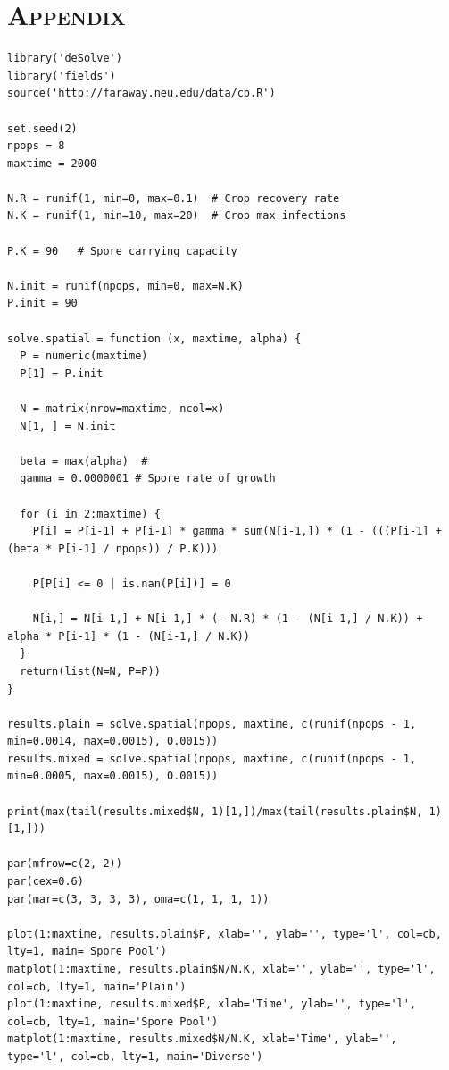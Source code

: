 \documentclass[a4paper,12pt]{article}
\newenvironment{code}{\fontfamily{cmtt}\selectfont}{\par}
\begin{document}

\newpage

\section*{\upshape\textsc{Appendix}}

\singlespacing

\begin{code}
\begin{lstlisting}[frame=single]
library('deSolve')
library('fields')
source('http://faraway.neu.edu/data/cb.R')

set.seed(2)
npops = 8
maxtime = 2000

N.R = runif(1, min=0, max=0.1)  # Crop recovery rate
N.K = runif(1, min=10, max=20)  # Crop max infections

P.K = 90   # Spore carrying capacity

N.init = runif(npops, min=0, max=N.K)
P.init = 90

solve.spatial = function (x, maxtime, alpha) {
  P = numeric(maxtime)
  P[1] = P.init

  N = matrix(nrow=maxtime, ncol=x)
  N[1, ] = N.init

  beta = max(alpha)  #
  gamma = 0.0000001 # Spore rate of growth

  for (i in 2:maxtime) {
    P[i] = P[i-1] + P[i-1] * gamma * sum(N[i-1,]) * (1 - (((P[i-1] + (beta * P[i-1] / npops)) / P.K)))

    P[P[i] <= 0 | is.nan(P[i])] = 0

    N[i,] = N[i-1,] + N[i-1,] * (- N.R) * (1 - (N[i-1,] / N.K)) + alpha * P[i-1] * (1 - (N[i-1,] / N.K))
  }
  return(list(N=N, P=P))
}

results.plain = solve.spatial(npops, maxtime, c(runif(npops - 1, min=0.0014, max=0.0015), 0.0015))
results.mixed = solve.spatial(npops, maxtime, c(runif(npops - 1, min=0.0005, max=0.0015), 0.0015))

print(max(tail(results.mixed$N, 1)[1,])/max(tail(results.plain$N, 1)[1,]))

par(mfrow=c(2, 2))
par(cex=0.6)
par(mar=c(3, 3, 3, 3), oma=c(1, 1, 1, 1))

plot(1:maxtime, results.plain$P, xlab='', ylab='', type='l', col=cb, lty=1, main='Spore Pool')
matplot(1:maxtime, results.plain$N/N.K, xlab='', ylab='', type='l', col=cb, lty=1, main='Plain')
plot(1:maxtime, results.mixed$P, xlab='Time', ylab='', type='l', col=cb, lty=1, main='Spore Pool')
matplot(1:maxtime, results.mixed$N/N.K, xlab='Time', ylab='', type='l', col=cb, lty=1, main='Diverse')



\end{lstlisting}
\end{code}
\end{document}
